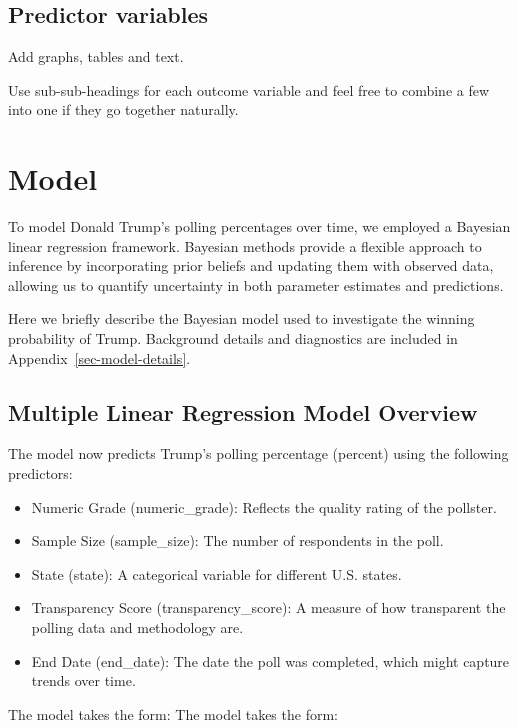 \documentclass[
  letterpaper,
  DIV=11,
  numbers=noendperiod]{scrartcl}
\providecommand{\tightlist}{%
  \setlength{\itemsep}{0pt}\setlength{\parskip}{0pt}}\usepackage{longtable,booktabs,array}
\begin{document}
\subsection{Predictor variables}\label{predictor-variables}

Add graphs, tables and text.

Use sub-sub-headings for each outcome variable and feel free to combine
a few into one if they go together naturally.

\section{Model}\label{model}

To model Donald Trump's polling percentages over time, we employed a
Bayesian linear regression framework. Bayesian methods provide a
flexible approach to inference by incorporating prior beliefs and
updating them with observed data, allowing us to quantify uncertainty in
both parameter estimates and predictions.

Here we briefly describe the Bayesian model used to investigate the
winning probability of Trump. Background details and diagnostics are
included in Appendix~\ref{sec-model-details}.

\subsection{Multiple Linear Regression Model
Overview}\label{multiple-linear-regression-model-overview}

The model now predicts Trump's polling percentage (percent) using the
following predictors:

\begin{itemize}
\tightlist
\item
  Numeric Grade (numeric\_grade): Reflects the quality rating of the
  pollster.
\item
  Sample Size (sample\_size): The number of respondents in the poll.
\item
  State (state): A categorical variable for different U.S. states.
\item
  Transparency Score (transparency\_score): A measure of how transparent
  the polling data and methodology are.
\item
  End Date (end\_date): The date the poll was completed, which might
  capture trends over time.
\end{itemize}

The model takes the form: The model takes the form:
\end{document}
